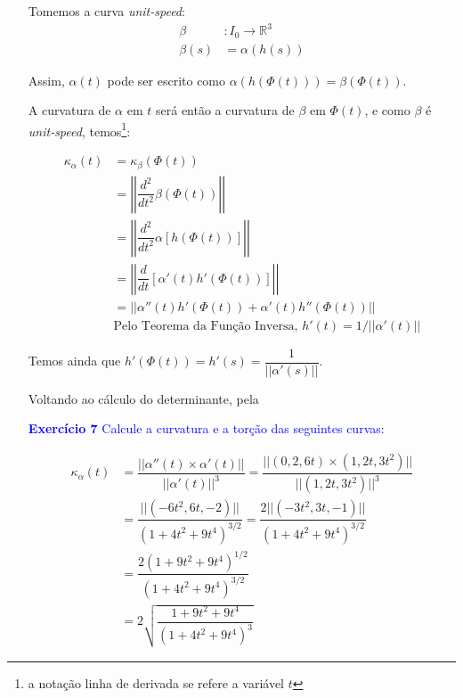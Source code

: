 \documentclass[12pt,letterpaper]{article}
\newcommand{\real}{\mathbb{R}}
\newcommand{\ex}[1]{\textcolor{blue}{\textbf{Exercício #1}}}
\newcommand{\blue}[1]{{\color{blue}{#1}}}
\begin{document}
\begin{enumerate}
	Tomemos a curva \textit{unit-speed}:
	\begin{align*}
		\beta&:I_0\to\real^3\\
		\beta(s)&=\alpha(h(s))
	\end{align*}
	
	Assim, $\alpha(t)$ pode ser escrito como $\alpha(h(\Phi(t)))=\beta(\Phi(t))$.
	
	A curvatura de $\alpha$ em $t$ será então a curvatura de $\beta$ em $\Phi(t)$, e como $\beta$ é \textit{unit-speed}, temos\footnote{a notação linha de derivada se refere a variável $t$}:
	
	\begin{align*}
		\kappa_\alpha(t)&=\kappa_\beta(\Phi(t))\\
		&=\left|\left|\dfrac{d^2}{dt^2}\beta(\Phi(t))\right|\right|\\
			&=\left|\left|\dfrac{d^2}{dt^2}\alpha[h(\Phi(t))]\right|\right|\\
			&=\left|\left|\dfrac{d}{dt}\left[\alpha'(t)h'(\Phi(t))\right]\right|\right|\\
			&=\left|\left|\alpha''(t)h'(\Phi(t))+\alpha'(t)h''(\Phi(t))\right|\right|\\
			&\text{Pelo Teorema da Função Inversa, $h'(t)=1/||\alpha'(t)||$}
	\end{align*}

 	Temos ainda que $h'(\Phi(t))=h'(s)=\dfrac{1}{||\alpha'(s)||}$.
 	
 	Voltando ao cálculo do determinante, pela 
	\item[\ex{7}] \textcolor{blue}{Calcule a curvatura e a torção das seguintes curvas:}
		\begin{enumerate}[(a)]
			\blue{
			\item $\alpha(t)=(t,t^2,t^3),t\in\real$}
				\begin{align*}
					\kappa_{\alpha}(t)&=\dfrac{||\alpha''(t)\times\alpha'(t)||}{||\alpha'(t)||^3}
					=\dfrac{||(0,2,6t)\times(1,2t,3t^2)||}{||(1,2t,3t^2)||^3}\\
					&=\dfrac{||(-6 t^2, 6 t, -2)||}{(1+4t^2+9t^4)^{3/2}}
					=\dfrac{2||(-3t^2,3t,-1)||}{(1+4t^2+9t^4)^{3/2}}\\
					&=\dfrac{2(1+9t^2+9t^4)^{1/2}}{(1+4t^2+9t^4)^{3/2}}\\
					&=2\sqrt{\dfrac{1+9t^2+9t^4}{(1+4t^2+9t^4)^3}}
				\end{align*}
			

\end{enumerate}
\end{enumerate}
\end{document}
